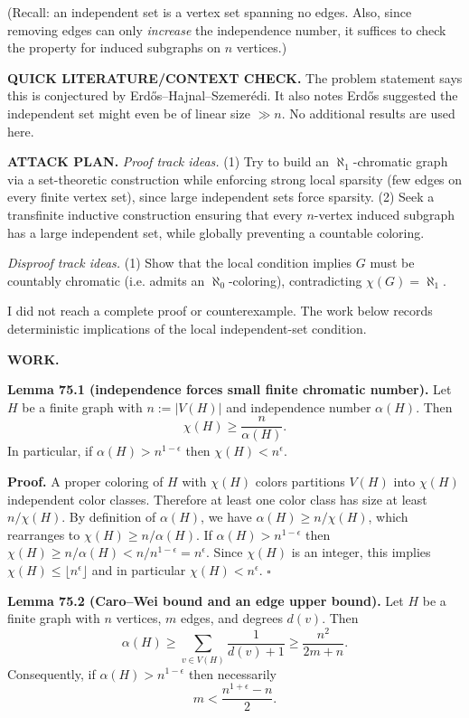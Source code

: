 (Recall: an independent set is a vertex set spanning no edges. Also, since removing edges can only \emph{increase} the independence number, it suffices to check the property for induced subgraphs on $n$ vertices.)

\medskip
\noindent\textbf{QUICK LITERATURE/CONTEXT CHECK.}
The problem statement says this is conjectured by Erd\H{o}s--Hajnal--Szemer\'{e}di. It also notes Erd\H{o}s suggested the independent set might even be of linear size $\gg n$. No additional results are used here.

\medskip
\noindent\textbf{ATTACK PLAN.}
\emph{Proof track ideas.}
(1) Try to build an $\aleph_1$-chromatic graph via a set-theoretic construction while enforcing strong local sparsity (few edges on every finite vertex set), since large independent sets force sparsity.
(2) Seek a transfinite inductive construction ensuring that every $n$-vertex induced subgraph has a large independent set, while globally preventing a countable coloring.

\emph{Disproof track ideas.}
(1) Show that the local condition implies $G$ must be countably chromatic (i.e. admits an $\aleph_0$-coloring), contradicting $\chi(G)=\aleph_1$.

I did not reach a complete proof or counterexample. The work below records deterministic implications of the local independent-set condition.

\medskip
\noindent\textbf{WORK.}

\medskip
\noindent\textbf{Lemma 75.1 (independence forces small finite chromatic number).}
Let $H$ be a finite graph with $n:=\lvert V(H)\rvert$ and independence number $\alpha(H)$. Then
\[\chi(H)\ge \frac{n}{\alpha(H)}.\]
In particular, if $\alpha(H)>n^{1-\epsilon}$ then $\chi(H)<n^{\epsilon}$.

\noindent\textbf{Proof.}
A proper coloring of $H$ with $\chi(H)$ colors partitions $V(H)$ into $\chi(H)$ independent color classes. Therefore at least one color class has size at least $n/\chi(H)$. By definition of $\alpha(H)$, we have $\alpha(H)\ge n/\chi(H)$, which rearranges to $\chi(H)\ge n/\alpha(H)$. If $\alpha(H)>n^{1-\epsilon}$ then $\chi(H)\ge n/\alpha(H)< n/n^{1-\epsilon}=n^{\epsilon}$. Since $\chi(H)$ is an integer, this implies $\chi(H)\le \lfloor n^{\epsilon}\rfloor$ and in particular $\chi(H)<n^{\epsilon}$.
\hfill$\square$

\medskip
\noindent\textbf{Lemma 75.2 (Caro--Wei bound and an edge upper bound).}
Let $H$ be a finite graph with $n$ vertices, $m$ edges, and degrees $d(v)$. Then
\[
\alpha(H)\ge \sum_{v\in V(H)}\frac{1}{d(v)+1}\ge \frac{n^2}{2m+n}.
\]
Consequently, if $\alpha(H)>n^{1-\epsilon}$ then necessarily
\[
m<\frac{n^{1+\epsilon}-n}{2}.
\]

